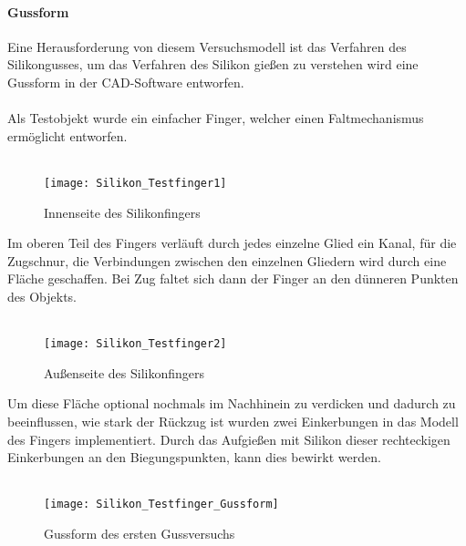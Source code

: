 \documentclass[titlepage,12pt,twoside]{article}
\begin{document}
\paragraph{Gussform}
\label{par:Gussform}
\hfill \break
\hfill \break
Eine Herausforderung von diesem Versuchsmodell ist das Verfahren des Silikongusses, um das Verfahren des Silikon gießen zu verstehen wird eine Gussform in der CAD-Software entworfen. \\
\\
Als Testobjekt wurde ein einfacher Finger, welcher einen Faltmechanismus ermöglicht entworfen. \\
\\
\begin{figure}[H]
	\begin{center}
		\scalebox{0.8}
		{\texttt{[image: Silikon\_Testfinger1]}}
		\caption{Innenseite des Silikonfingers}
		\label{fig:Silikon_Testfinger1}			
	\end{center}
\end{figure}
\hfill \break
Im oberen Teil des Fingers verläuft durch jedes einzelne Glied ein Kanal, für die Zugschnur, die Verbindungen zwischen den einzelnen Gliedern wird durch eine Fläche geschaffen. Bei Zug faltet sich dann der Finger an den dünneren Punkten des Objekts. \\
\\
\begin{figure}[H]
	\begin{center}
		\scalebox{0.8}
		{\texttt{[image: Silikon\_Testfinger2]}}
		\caption{Außenseite des Silikonfingers}
		\label{fig:Silikon_Testfinger2}			
	\end{center}
\end{figure}
\hfill \break
Um diese Fläche optional nochmals im Nachhinein zu verdicken und dadurch zu beeinflussen, wie stark der Rückzug ist wurden zwei Einkerbungen in das Modell des Fingers implementiert. Durch das Aufgießen mit Silikon dieser rechteckigen Einkerbungen 
an den Biegungspunkten, kann dies bewirkt werden. \\
\\
\begin{figure}[H]
	\begin{center}
		\scalebox{0.8}
		{\texttt{[image: Silikon\_Testfinger\_Gussform]}}
		\caption{Gussform des ersten Gussversuchs}
		\label{fig:Silikon_Testfinger_Gussform}			
	\end{center}
\end{figure}
\hfill \break
\end{document}
